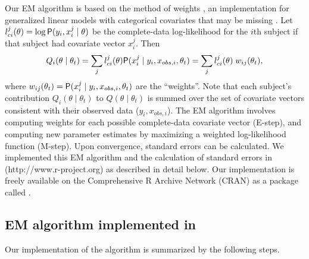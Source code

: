 \documentclass[article, shortnames]{jss}
\begin{document}
Our EM algorithm is based on the method of weights \citep{Ibrahim90}, an
implementation for generalized linear models with categorical covariates
that may be missing \citep[see][for a review]{HortonLaird99}. 
Let $l_{ci}^j(\theta)=\log \mathsf{P}(y_i, x_i^j \mid \theta)$
be the complete-data log-likelihood for the $i$th subject
if that subject had covariate vector $x_i^j$. Then 
$$Q_i (\theta \mid \theta_t)= \sum_j l_{ci}^j(\theta)
\mathsf{P}(x_i^j \mid y_i, x_{obs,i}, \theta_t) 
= \sum_j l_{ci}^j(\theta ) \; w_{ij}(\theta_t), $$
where $w_{ij}(\theta_t)=\mathsf{P}(x_i^j \mid y_i, x_{obs,i}, \theta_t)$ are the
``weights''. 
Note that each subject's contribution $Q_i(\theta \mid \theta_t)$ to $Q(\theta
\mid \theta_t)$ is summed over the set of covariate vectors consistent
with their observed data ($y_i,x_{obs,i}$). The EM algorithm involves 
computing weights for each possible complete-data covariate vector (E-step), 
and computing new parameter estimates by maximizing a weighted 
log-likelihood function (M-step). Upon convergence, standard errors can be 
calculated.  We implemented this EM algorithm and the calculation of 
standard errors in  (http://www.r-project.org) as described 
in detail below. Our implementation is freely available on the Comprehensive 
R Archive Network (CRAN) as a package called .
  
\subsection[EM algorithm implemented in hapassoc]{EM algorithm implemented in }

Our implementation of the algorithm is summarized by the following steps.
\end{document}
